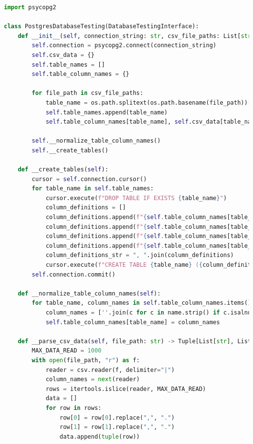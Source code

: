 \begin{lstlisting}[language=Python, caption=PostgresDatabaseTesting]
import psycopg2

class PostgresDatabaseTesting(DatabaseTestingInterface):
    def __init__(self, connection_string: str, csv_file_paths: List[str]):
        self.connection = psycopg2.connect(connection_string)
        self.csv_data = {}
        self.table_names = []
        self.table_column_names = {}

        for file_path in csv_file_paths:
            table_name = os.path.splitext(os.path.basename(file_path))[0]
            self.table_names.append(table_name)
            self.table_column_names[table_name], self.csv_data[table_name] = self.__parse_csv_data(file_path)

        self.__normalize_table_column_names()
        self.__create_tables()

    def __create_tables(self):
        cursor = self.connection.cursor()
        for table_name in self.table_names:
            cursor.execute(f"DROP TABLE IF EXISTS {table_name}")
            column_definitions = []
            column_definitions.append(f"{self.table_column_names[table_name][0]} timestamp NOT NULL")
            column_definitions.append(f"{self.table_column_names[table_name][1]} timestamp NOT NULL")
            column_definitions.append(f"{self.table_column_names[table_name][2]} numeric NOT NULL")
            column_definitions.append(f"{self.table_column_names[table_name][3]} integer")
            column_definitions_str = ", ".join(column_definitions)
            cursor.execute(f"CREATE TABLE {table_name} ({column_definitions_str})")
        self.connection.commit()

    def __normalize_table_column_names(self):
        for table_name, column_names in self.table_column_names.items():
            column_names = [''.join(c for c in name.strip() if c.isalnum() or c == '_') for name in column_names]
            self.table_column_names[table_name] = column_names

    def __parse_csv_data(self, file_path: str) -> Tuple[List[str], List[Tuple[str, str, float, int]]]:
        MAX_DATA_READ = 1000
        with open(file_path, "r") as f:
            reader = csv.reader(f, delimiter="|")
            column_names = next(reader)
            rows = itertools.islice(reader, MAX_DATA_READ)
            data = []
            for row in rows:
                row[0] = row[0].replace(",", ".")
                row[1] = row[1].replace(",", ".")
                data.append(tuple(row))


\end{lstlisting}
